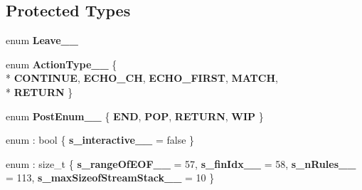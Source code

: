 \subsection*{Protected Types}
\begin{DoxyCompactItemize}
\item 
\hypertarget{classScannerBase_aba19fcbdd61aaa668cd65fd00ef856f5}{enum {\bfseries Leave\+\_\+\+\_\+} }\label{classScannerBase_aba19fcbdd61aaa668cd65fd00ef856f5}

\item 
\hypertarget{classScannerBase_aeca9da0ddb2e5928570501a6354d7fca}{enum {\bfseries Action\+Type\+\_\+\+\_\+} \{ \\*
{\bfseries C\+O\+N\+T\+I\+N\+U\+E}, 
{\bfseries E\+C\+H\+O\+\_\+\+C\+H}, 
{\bfseries E\+C\+H\+O\+\_\+\+F\+I\+R\+S\+T}, 
{\bfseries M\+A\+T\+C\+H}, 
\\*
{\bfseries R\+E\+T\+U\+R\+N}
 \}}\label{classScannerBase_aeca9da0ddb2e5928570501a6354d7fca}

\item 
\hypertarget{classScannerBase_a6b05193c90b76c2923c127381f3f487a}{enum {\bfseries Post\+Enum\+\_\+\+\_\+} \{ {\bfseries E\+N\+D}, 
{\bfseries P\+O\+P}, 
{\bfseries R\+E\+T\+U\+R\+N}, 
{\bfseries W\+I\+P}
 \}}\label{classScannerBase_a6b05193c90b76c2923c127381f3f487a}

\item 
\hypertarget{classScannerBase_a05438c73aa59e8fdcd61d6c46087d3fd}{enum \+: bool \{ {\bfseries s\+\_\+interactive\+\_\+\+\_\+} = false
 \}}\label{classScannerBase_a05438c73aa59e8fdcd61d6c46087d3fd}

\item 
\hypertarget{classScannerBase_ace58cd1a2ba5ff08fb6c6460cabe6f2e}{enum \+: size\+\_\+t \{ {\bfseries s\+\_\+range\+Of\+E\+O\+F\+\_\+\+\_\+} = 57, 
{\bfseries s\+\_\+fin\+Idx\+\_\+\+\_\+} = 58, 
{\bfseries s\+\_\+n\+Rules\+\_\+\+\_\+} = 113, 
{\bfseries s\+\_\+max\+Sizeof\+Stream\+Stack\+\_\+\+\_\+} = 10
 \}}\label{classScannerBase_ace58cd1a2ba5ff08fb6c6460cabe6f2e}

\end{DoxyCompactItemize}
